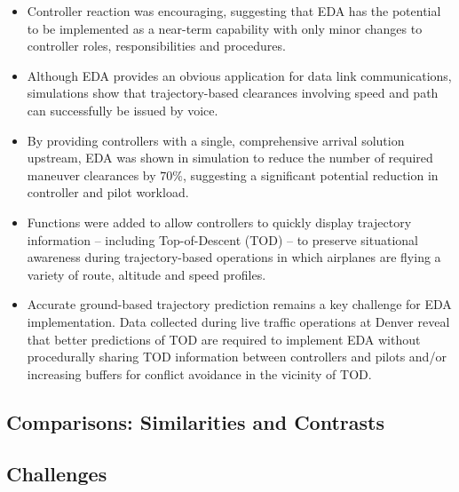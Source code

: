 \documentclass{aer1315-pretty}
\begin{document}
\begin{itemize}
\begin{itemize}
\item Controller reaction was encouraging, suggesting that EDA has the potential to be implemented as a near-term capability with only minor changes to controller roles,
responsibilities and procedures. 
\item Although EDA provides an obvious application for data link communications, simulations show that trajectory-based clearances involving speed and path can successfully be issued by voice. 
\item By providing controllers with a single, comprehensive arrival solution upstream, EDA was shown in simulation to reduce the number of required maneuver clearances by $70\%$, suggesting a significant potential reduction in controller and pilot workload.
\item Functions were added to allow controllers to quickly display trajectory information – including Top-of-Descent (TOD) – to preserve situational awareness during trajectory-based operations in which airplanes are flying a variety of route, altitude and speed profiles.
\item Accurate ground-based trajectory prediction remains a key challenge for EDA implementation. Data collected during live traffic operations at Denver reveal that better
predictions of TOD are required to implement EDA without procedurally sharing TOD information between controllers and pilots and/or increasing buffers for conflict avoidance in the vicinity of TOD. 
\end{itemize}



\end{itemize}

\subsection{Comparisons: Similarities and Contrasts} \label{ssec:comparisons}



\subsection{Challenges} \label{ssec:challenges}
\end{document}
